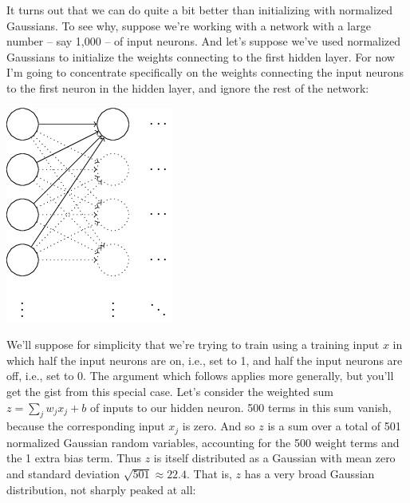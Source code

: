 \documentclass[a4paper,twoside,10pt]{book}
\begin{document}
It turns out that we can do quite a bit better than initializing with normalized Gaussians. To see why, suppose we're working with a network with a large number -- say 1,000 -- of input neurons. And let's suppose we've used normalized Gaussians to initialize the weights connecting to the first hidden layer. For now I'm going to concentrate specifically on the weights connecting the input neurons to the first neuron in the hidden layer, and ignore the rest of the network:
\begin{center}
	\includegraphics[width=0.35\linewidth]{figures/ch3/tikz32}
\end{center}
We'll suppose for simplicity that we're trying to train using a training input $x$ in which half the input neurons are on, i.e., set to 1, and half the input neurons are off, i.e., set to 0. The argument which follows applies more generally, but you'll get the gist from this special case. Let's consider the weighted sum $z=\sum_jw_jx_j+b$ of inputs to our hidden neuron. 500 terms in this sum vanish, because the corresponding input $x_j$ is zero. And so $z$ is a sum over a total of 501 normalized Gaussian random variables, accounting for the 500 weight terms and the 1 extra bias term. Thus $z$ is itself distributed as a Gaussian with mean zero and standard deviation $\sqrt{501}\approx 22.4$. That is, $z$ has a very broad Gaussian distribution, not sharply peaked at all:
\begin{center}
\end{center}
\end{document}
